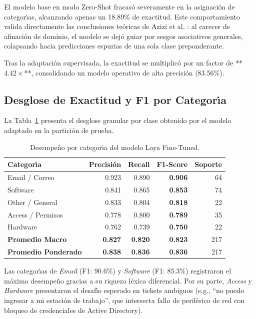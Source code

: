 \documentclass[10pt,journal,compsoc]{IEEEtran}
\begin{document}
El modelo base en modo Zero-Shot fracas\'o severamente en la asignaci\'on de categor\'{\i}as, alcanzando apenas un 18.89\% de exactitud. Este comportamiento valida directamente las conclusiones te\'oricas de Azizi et al. \cite{azizi2026labels}: al carecer de afinaci\'on de dominio, el modelo se dej\'o guiar por sesgos asociativos generales, colapsando hacia predicciones espurias de una sola clase preponderante. 

Tras la adaptaci\'on supervisada, la exactitud se multiplic\'o por un factor de **$4.42\times$**, consolidando un modelo operativo de alta precisi\'on (83.56\%).

\subsection{Desglose de Exactitud y F1 por Categor\'{\i}a}
La Tabla~\ref{tab:class_breakdown} presenta el desglose granular por clase obtenido por el modelo adaptado en la partici\'on de prueba.

\begin{table}[h]
\centering
\caption{Desempe\~no por categor\'{\i}a del modelo Laya Fine-Tuned.}
\label{tab:class_breakdown}
\begin{tabular}{lrrrr}
\toprule
\textbf{Categor\'{\i}a} & \textbf{Precisi\'on} & \textbf{Recall} & \textbf{F1-Score} & \textbf{Soporte} \\
\midrule
Email / Correo & 0.923 & 0.890 & \textbf{0.906} & 64 \\
Software & 0.841 & 0.865 & \textbf{0.853} & 74 \\
Other / General & 0.833 & 0.804 & \textbf{0.818} & 22 \\
Access / Permisos & 0.778 & 0.800 & \textbf{0.789} & 35 \\
Hardware & 0.762 & 0.739 & \textbf{0.750} & 22 \\
\midrule
\textbf{Promedio Macro} & \textbf{0.827} & \textbf{0.820} & \textbf{0.823} & 217 \\
\textbf{Promedio Ponderado} & \textbf{0.838} & \textbf{0.836} & \textbf{0.836} & 217 \\
\bottomrule
\end{tabular}
\end{table}

Las categor\'{\i}as de \emph{Email} (F1: 90.6\%) y \emph{Software} (F1: 85.3\%) registraron el m\'aximo desempe\~no gracias a su riqueza l\'exica diferencial. Por su parte, \emph{Access} y \emph{Hardware} presentaron el desaf\'{\i}o esperado en tickets ambiguos (e.g., ``no puedo ingresar a mi estaci\'on de trabajo'', que intersecta fallo de perif\'erico de red con bloqueo de credenciales de Active Directory).
\end{document}

